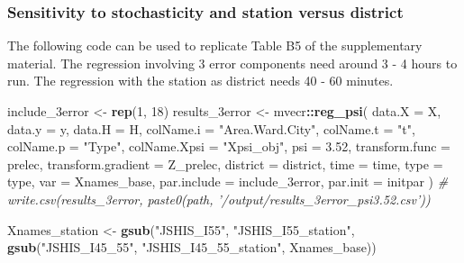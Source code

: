 \documentclass[
]{article}
\newenvironment{Shaded}{\begin{snugshade}}{\end{snugshade}}
\newcommand{\CommentTok}[1]{\textcolor[rgb]{0.56,0.35,0.01}{\textit{#1}}}
\newcommand{\DataTypeTok}[1]{\textcolor[rgb]{0.13,0.29,0.53}{#1}}
\newcommand{\DecValTok}[1]{\textcolor[rgb]{0.00,0.00,0.81}{#1}}
\newcommand{\FloatTok}[1]{\textcolor[rgb]{0.00,0.00,0.81}{#1}}
\newcommand{\KeywordTok}[1]{\textcolor[rgb]{0.13,0.29,0.53}{\textbf{#1}}}
\newcommand{\NormalTok}[1]{#1}
\newcommand{\OperatorTok}[1]{\textcolor[rgb]{0.81,0.36,0.00}{\textbf{#1}}}
\newcommand{\StringTok}[1]{\textcolor[rgb]{0.31,0.60,0.02}{#1}}
\begin{document}
\hypertarget{sensitivity-to-stochasticity-and-station-versus-district}{%
\subsubsection{Sensitivity to stochasticity and station versus
district}\label{sensitivity-to-stochasticity-and-station-versus-district}}

The following code can be used to replicate Table B5 of the
supplementary material. The regression involving 3 error components need
around 3 - 4 hours to run. The regression with the station as district
needs 40 - 60 minutes.

\begin{Shaded}
\begin{Highlighting}[]
\NormalTok{include_3error <-}\StringTok{ }\KeywordTok{rep}\NormalTok{(}\DecValTok{1}\NormalTok{, }\DecValTok{18}\NormalTok{)}
\NormalTok{results_3error <-}\StringTok{ }\NormalTok{mvecr}\OperatorTok{::}\KeywordTok{reg_psi}\NormalTok{(}
  \DataTypeTok{data.X =}\NormalTok{ X, }\DataTypeTok{data.y =}\NormalTok{ y, }\DataTypeTok{data.H =}\NormalTok{ H,}
  \DataTypeTok{colName.i =} \StringTok{"Area.Ward.City"}\NormalTok{, }\DataTypeTok{colName.t =} \StringTok{"t"}\NormalTok{, }
  \DataTypeTok{colName.p =} \StringTok{"Type"}\NormalTok{, }\DataTypeTok{colName.Xpsi =} \StringTok{"Xpsi_obj"}\NormalTok{,}
  \DataTypeTok{psi =} \FloatTok{3.52}\NormalTok{,}
  \DataTypeTok{transform.func =}\NormalTok{ prelec, }\DataTypeTok{transform.gradient =}\NormalTok{ Z_prelec,}
  \DataTypeTok{district =}\NormalTok{ district, }\DataTypeTok{time =}\NormalTok{ time, }\DataTypeTok{type =}\NormalTok{ type,}
  \DataTypeTok{var =}\NormalTok{ Xnames_base,}
  \DataTypeTok{par.include =}\NormalTok{ include_3error,}
  \DataTypeTok{par.init =}\NormalTok{ initpar}
\NormalTok{)}
\CommentTok{# write.csv(results_3error, paste0(path, '/output/results_3error_psi3.52.csv'))}


\NormalTok{Xnames_station <-}\StringTok{ }\KeywordTok{gsub}\NormalTok{(}\StringTok{"JSHIS_I55"}\NormalTok{, }\StringTok{"JSHIS_I55_station"}\NormalTok{,}
                       \KeywordTok{gsub}\NormalTok{(}\StringTok{"JSHIS_I45_55"}\NormalTok{,}
                       \StringTok{"JSHIS_I45_55_station"}\NormalTok{,}
\NormalTok{                       Xnames_base))}


\end{Highlighting}
\end{Shaded}
\end{document}
